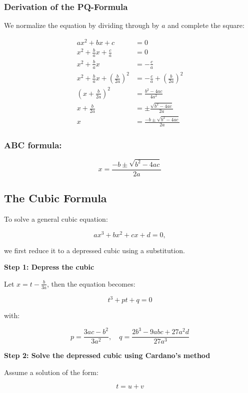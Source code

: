 \subsubsection{Derivation of the PQ-Formula}

We normalize the equation by dividing through by \(a\) and complete the square:

\begin{align*}
    ax^2 + bx + c &= 0 \\
    x^2 + \frac{b}{a}x + \frac{c}{a} &= 0 \\
    x^2 + \frac{b}{a}x &= -\frac{c}{a} \\
    x^2 + \frac{b}{a}x + {\left(\frac{b}{2a}\right)}^2 &= -\frac{c}{a} + {\left(\frac{b}{2a}\right)}^2 \\
    {\left(x + \frac{b}{2a}\right)}^2 &= \frac{b^2 - 4ac}{4a^2} \\
    x + \frac{b}{2a} &= \pm \frac{\sqrt{b^2 - 4ac}}{2a} \\
    x &= \frac{-b \pm \sqrt{b^2 - 4ac}}{2a}
\end{align*}

\subsubsection{ABC formula:}

\[
    x = \frac{-b \pm \sqrt{b^2 - 4ac}}{2a}
\]

\subsection{The Cubic Formula}

To solve a general cubic equation:

\[
    ax^3 + bx^2 + cx + d = 0,
\]

we first reduce it to a depressed cubic using a substitution.

\textbf{Step 1: Depress the cubic}

Let \(x = t - \frac{b}{3a}\), then the equation becomes:

\[
    t^3 + pt + q = 0
\]

with:

\[
    p = \frac{3ac - b^2}{3a^2}, \quad q = \frac{2b^3 - 9abc + 27a^2d}{27a^3}
\]

\textbf{Step 2: Solve the depressed cubic using Cardano’s method}

Assume a solution of the form:

\[
    t = u + v
\]

